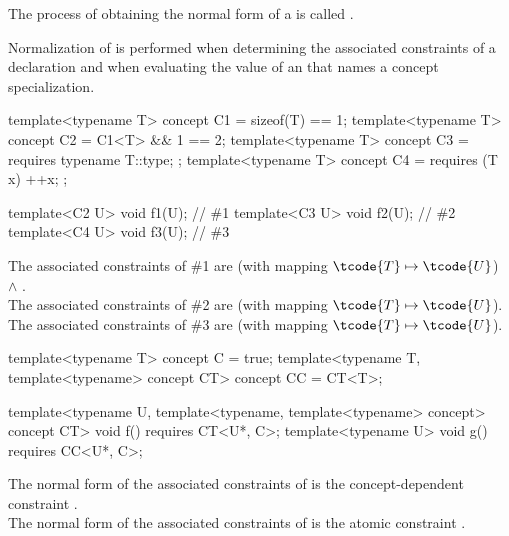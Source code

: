 \pnum
The process of obtaining the normal form of a
is called
.
\begin{note}
Normalization of 
is performed
when determining the associated constraints
of a declaration
and
when evaluating the value of an 
that names a concept specialization.
\end{note}

\pnum
\begin{example}
\begin{codeblock}
template<typename T> concept C1 = sizeof(T) == 1;
template<typename T> concept C2 = C1<T> && 1 == 2;
template<typename T> concept C3 = requires { typename T::type; };
template<typename T> concept C4 = requires (T x) { ++x; };

template<C2 U> void f1(U);      // \#1
template<C3 U> void f2(U);      // \#2
template<C4 U> void f3(U);      // \#3
\end{codeblock}
The associated constraints of \#1 are
 (with mapping $\tcode{T} \mapsto \tcode{U}$) $\land$ .\\
The associated constraints of \#2 are
 (with mapping $\tcode{T} \mapsto \tcode{U}$).\\
The associated constraints of \#3 are
 (with mapping $\tcode{T} \mapsto \tcode{U}$).
\end{example}

\begin{example}
\begin{codeblock}
template<typename T>
concept C = true;
template<typename T, template<typename> concept CT>
concept CC = CT<T>;

template<typename U,
         template<typename, template<typename> concept> concept CT>
  void f() requires CT<U*, C>;
template<typename U>
  void g() requires CC<U*, C>;
\end{codeblock}
The normal form of the associated constraints of  is
the concept-dependent constraint .\\
The normal form of the associated constraints of  is
the atomic constraint .
\end{example}

